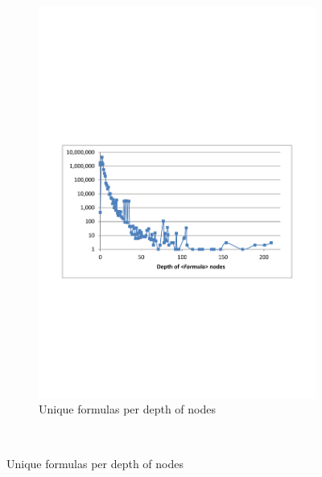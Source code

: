 \documentclass[times]{smrauth}
\begin{document}
\begin{figure}
\begin{subfigure}[b]{0.49\textwidth}
		\label{fig:depthTree}
	\end{subfigure}
	~
	\begin{subfigure}[b]{0.49\textwidth}
		\centering
		\includegraphics[width=1\textwidth]{img/depths2}
		\caption{Unique formulas per depth of  nodes}
		\label{fig:depthFormula}
	\end{subfigure}
	~
	

\end{figure}
\end{document}
